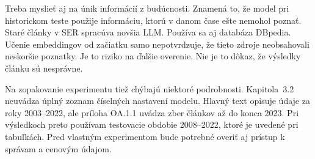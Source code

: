 Treba myslieť aj na únik informácií z budúcnosti. Znamená to, že model pri historickom teste použije informáciu, ktorú v danom čase ešte nemohol poznať. Staré články v SER spracúva novšia LLM. Používa sa aj databáza DBpedia. Učenie embeddingov od začiatku samo nepotvrdzuje, že tieto zdroje neobsahovali neskoršie poznatky. Je to riziko na ďalšie overenie. Nie je to dôkaz, že výsledky článku sú nesprávne.

Na zopakovanie experimentu tiež chýbajú niektoré podrobnosti. Kapitola~3.2 neuvádza úplný zoznam číselných nastavení modelu. Hlavný text opisuje údaje za roky 2003--2022, ale príloha OA.1.1 uvádza zber článkov až do konca 2023. Pri výsledkoch preto používam testovacie obdobie 2008--2022, ktoré je uvedené pri tabuľkách. Pred vlastným experimentom bude potrebné overiť aj prístup k správam a cenovým údajom.
